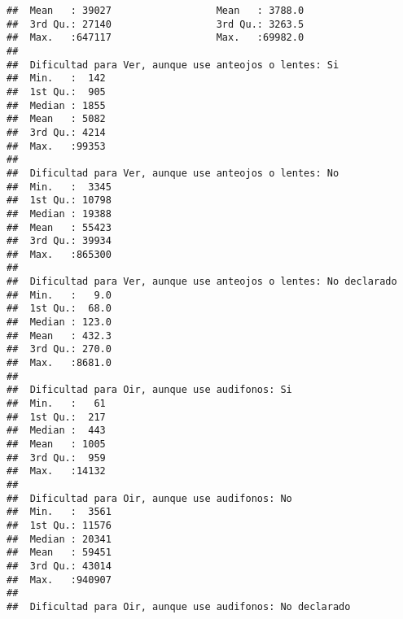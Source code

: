 \documentclass[11pt,]{article}
\begin{document}
\begin{verbatim}
##  Mean   : 39027                  Mean   : 3788.0                 
##  3rd Qu.: 27140                  3rd Qu.: 3263.5                 
##  Max.   :647117                  Max.   :69982.0                 
##                                                                  
##  Dificultad para Ver, aunque use anteojos o lentes: Si
##  Min.   :  142                                        
##  1st Qu.:  905                                        
##  Median : 1855                                        
##  Mean   : 5082                                        
##  3rd Qu.: 4214                                        
##  Max.   :99353                                        
##                                                       
##  Dificultad para Ver, aunque use anteojos o lentes: No
##  Min.   :  3345                                       
##  1st Qu.: 10798                                       
##  Median : 19388                                       
##  Mean   : 55423                                       
##  3rd Qu.: 39934                                       
##  Max.   :865300                                       
##                                                       
##  Dificultad para Ver, aunque use anteojos o lentes: No declarado
##  Min.   :   9.0                                                 
##  1st Qu.:  68.0                                                 
##  Median : 123.0                                                 
##  Mean   : 432.3                                                 
##  3rd Qu.: 270.0                                                 
##  Max.   :8681.0                                                 
##                                                                 
##  Dificultad para Oir, aunque use audifonos: Si
##  Min.   :   61                                
##  1st Qu.:  217                                
##  Median :  443                                
##  Mean   : 1005                                
##  3rd Qu.:  959                                
##  Max.   :14132                                
##                                               
##  Dificultad para Oir, aunque use audifonos: No
##  Min.   :  3561                               
##  1st Qu.: 11576                               
##  Median : 20341                               
##  Mean   : 59451                               
##  3rd Qu.: 43014                               
##  Max.   :940907                               
##                                               
##  Dificultad para Oir, aunque use audifonos: No declarado

\end{verbatim}
\end{document}
